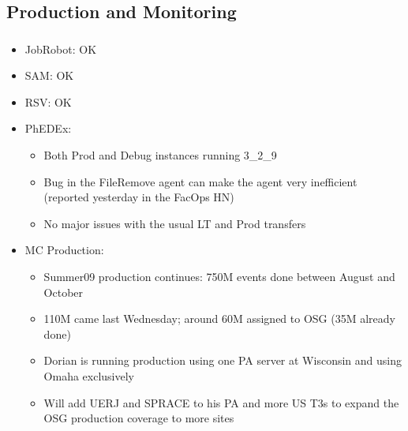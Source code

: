 \documentclass{beamer}
\begin{document}
\subsection{Production and Monitoring}
\begin{frame}
\frametitle{}
\begin{itemize}
	\item JobRobot: OK
	\item SAM: OK
	\item RSV: OK
	\item PhEDEx:
	\begin{itemize}
		\item Both Prod and Debug instances running 3\_2\_9
		\item Bug in the FileRemove agent can make the agent very inefficient (reported yesterday in the FacOps HN)
		\item No major issues with the usual LT and Prod transfers
	\end{itemize}
	\item MC Production:
	\begin{itemize}
		\item Summer09 production continues: 750M events done between August and October
		\item 110M came last Wednesday; around 60M assigned to OSG (35M already done)
		\item Dorian is running production using one PA server at Wisconsin and using Omaha exclusively
		\item Will add UERJ and SPRACE to his PA and more US T3s to expand the OSG production coverage to more sites
	\end{itemize}
\end{itemize}
\end{frame}
\end{document}
